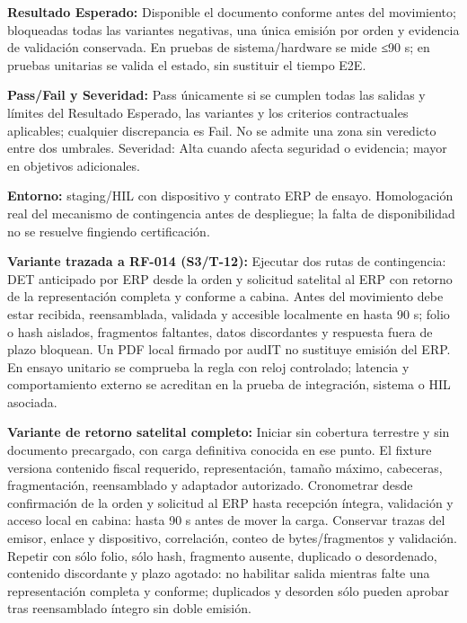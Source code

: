 \par\noindent\textbf{Resultado Esperado:} Disponible el documento conforme antes del movimiento; bloqueadas todas las variantes negativas, una única emisión por orden y evidencia de validación conservada. En pruebas de sistema/hardware se mide ≤90 s; en pruebas unitarias se valida el estado, sin sustituir el tiempo E2E.\par
\par\noindent\textbf{Pass/Fail y Severidad:} Pass únicamente si se cumplen todas las salidas y límites del Resultado Esperado, las variantes y los criterios contractuales aplicables; cualquier discrepancia es Fail. No se admite una zona sin veredicto entre dos umbrales. Severidad: Alta cuando afecta seguridad o evidencia; mayor en objetivos adicionales.\par
\par\noindent\textbf{Entorno:} staging/HIL con dispositivo y contrato ERP de ensayo. Homologación real del mecanismo de contingencia antes de despliegue; la falta de disponibilidad no se resuelve fingiendo certificación.\par


\par\noindent\textbf{Variante trazada a RF-014 (S3/T-12):} Ejecutar dos rutas de contingencia: DET anticipado por ERP desde la orden y solicitud satelital al ERP con retorno de la representación completa y conforme a cabina. Antes del movimiento debe estar recibida, reensamblada, validada y accesible localmente en hasta 90 s; folio o hash aislados, fragmentos faltantes, datos discordantes y respuesta fuera de plazo bloquean. Un PDF local firmado por audIT no sustituye emisión del ERP. En ensayo unitario se comprueba la regla con reloj controlado; latencia y comportamiento externo se acreditan en la prueba de integración, sistema o HIL asociada.\par

\par\noindent\textbf{Variante de retorno satelital completo:} Iniciar sin cobertura terrestre y sin documento precargado, con carga definitiva conocida en ese punto. El fixture versiona contenido fiscal requerido, representación, tamaño máximo, cabeceras, fragmentación, reensamblado y adaptador autorizado. Cronometrar desde confirmación de la orden y solicitud al ERP hasta recepción íntegra, validación y acceso local en cabina: hasta 90 s antes de mover la carga. Conservar trazas del emisor, enlace y dispositivo, correlación, conteo de bytes/fragmentos y validación. Repetir con sólo folio, sólo hash, fragmento ausente, duplicado o desordenado, contenido discordante y plazo agotado: no habilitar salida mientras falte una representación completa y conforme; duplicados y desorden sólo pueden aprobar tras reensamblado íntegro sin doble emisión.\par

